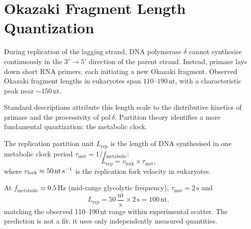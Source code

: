 \section{Okazaki Fragment Length Quantization}
\label{sec:okazaki_quantization}

During replication of the lagging strand, DNA polymerase $\delta$ cannot
synthesise continuously in the $3' \to 5'$ direction of the parent strand.
Instead, primase lays down short RNA primers, each initiating a new Okazaki
fragment. Observed Okazaki fragment lengths in eukaryotes span
$110$--$190\,\text{nt}$, with a characteristic peak near $\sim 150\,\text{nt}$.

Standard descriptions attribute this length scale to the distributive kinetics
of primase and the processivity of pol\,$\delta$. Partition theory identifies a
more fundamental quantization: the metabolic clock.

\begin{definition}
\label{def:rep_partition_unit}
The replication partition unit $L_{\mathrm{rep}}$ is the length of DNA
synthesised in one metabolic clock period $\tau_{\mathrm{met}} = 1/f_{\mathrm{metabolic}}$:
\begin{equation}
  L_{\mathrm{rep}} = v_{\mathrm{fork}} \times \tau_{\mathrm{met}},
  \label{eq:rep_partition_unit}
\end{equation}
where $v_{\mathrm{fork}} \approx 50\,\text{nt\,s}^{-1}$ is the replication
fork velocity in eukaryotes.
\end{definition}

At $f_{\mathrm{metabolic}} \approx 0.5\,\text{Hz}$ (mid-range glycolytic
frequency), $\tau_{\mathrm{met}} = 2\,\text{s}$ and
\begin{equation}
  L_{\mathrm{rep}} = 50\,\frac{\text{nt}}{\text{s}} \times 2\,\text{s}
  = 100\,\text{nt},
  \label{eq:okazaki_prediction}
\end{equation}
matching the observed 110--190\,nt range within experimental scatter. The
prediction is not a fit; it uses only independently measured quantities.

